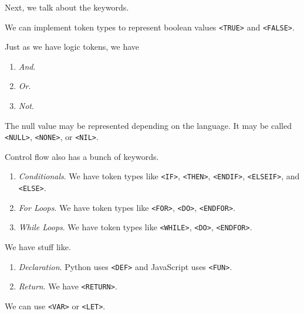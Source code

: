   Next, we talk about the keywords. 

  \begin{example}[Boolean]
    We can implement token types to represent boolean values \texttt{<TRUE>} and \texttt{<FALSE>}. 
  \end{example}

  \begin{example}
    Just as we have logic tokens, we have 
    \begin{enumerate}
      \item \textit{And}. 
      \item \textit{Or}. 
      \item \textit{Not}. 
    \end{enumerate}
  \end{example}

  \begin{example}
    The null value may be represented depending on the language. It may be called \texttt{<NULL>}, \texttt{<NONE>}, or \texttt{<NIL>}. 
  \end{example}

  \begin{example}
    Control flow also has a bunch of keywords. 
    \begin{enumerate}
      \item \textit{Conditionals}. We have token types like \texttt{<IF>}, \texttt{<THEN>}, \texttt{<ENDIF>}, \texttt{<ELSEIF>}, and \texttt{<ELSE>}. 
      \item \textit{For Loops}. We have token types like \texttt{<FOR>}, \texttt{<DO>}, \texttt{<ENDFOR>}. 
      \item \textit{While Loops}. We have token types like \texttt{<WHILE>}, \texttt{<DO>}, \texttt{<ENDFOR>}. 
    \end{enumerate}
  \end{example}

  \begin{example}[Functions]
    We have stuff like. 
    \begin{enumerate}
      \item \textit{Declaration}. Python uses \texttt{<DEF>} and JavaScript uses \texttt{<FUN>}. 
      \item \textit{Return}. We have \texttt{<RETURN>}. 
    \end{enumerate}
  \end{example}

  \begin{example}
    We can use \texttt{<VAR>} or \texttt{<LET>}. 
  \end{example}

